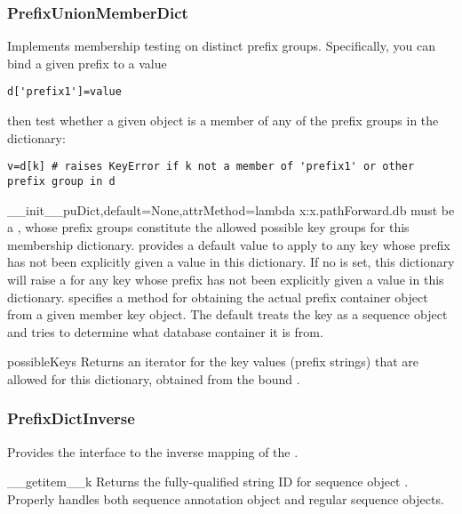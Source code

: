 \documentclass{howto}
\begin{document}
\subsubsection{PrefixUnionMemberDict}
Implements membership testing on distinct prefix groups.  Specifically,
you can bind a given prefix to a value
\begin{verbatim}
d['prefix1']=value
\end{verbatim}
then test whether a given object  is a member of any of the
prefix groups in the dictionary:
\begin{verbatim}
v=d[k] # raises KeyError if k not a member of 'prefix1' or other prefix group in d
\end{verbatim}

\begin{funcdesc}{__init__}{puDict,default=None,attrMethod=lambda x:x.pathForward.db}
   must be a , whose prefix groups constitute the
  allowed possible key groups for this membership dictionary.  
  provides a default value to apply to any key whose prefix has not been explicitly
  given a value in this dictionary.  If no  is set, this dictionary
  will raise a  for any key whose prefix has not been 
  explicitly given a value in this dictionary.
   specifies a method for obtaining
  the actual prefix container object from a given member key object.  The default
   treats the key as a sequence object and tries to determine what
  database container it is from.
\end{funcdesc}

\begin{funcdesc}{possibleKeys}{}
  Returns an iterator for the key values (prefix strings) that are allowed for 
  this dictionary, obtained from the bound .
\end{funcdesc}

\subsubsection{PrefixDictInverse}
Provides the interface to the inverse mapping of the .
\begin{funcdesc}{__getitem__}{k}
  Returns the fully-qualified string ID for sequence object .  
  Properly handles both sequence annotation object and regular sequence
  objects.
\end{funcdesc}
\end{document}
